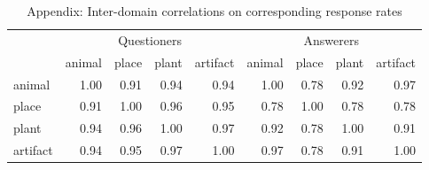 \documentclass[11pt, floatsintext]{apa6}
\begin{document}
\begin{table}[t!]
\centering
\begin{tabular}{ p{1.5cm} | r | r | r | r |||||| r | r | r | r |}
& \multicolumn{4}{c||||||}{Questioners} & \multicolumn{4}{c}{Answerers} \\
&             animal &     place &     plant &  artifact &            animal &     place &     plant &  artifact \\
\hline
animal &   1.00 &  0.91 & 0.94 & 0.94 & 1.00 & 0.78 & 0.92 &  0.97 \\
\hline
place &    0.91 &  1.00 & 0.96 & 0.95 & 0.78 & 1.00 &  0.78 & 0.78 \\
\hline
plant &    0.94 & 0.96 & 1.00 & 0.97 & 0.92  & 0.78 &  1.00 & 0.91\\
\hline
artifact & 0.94 & 0.95 & 0.97 & 1.00 & 0.97 & 0.78 &  0.91 & 1.00\\
\end{tabular}
\\[1.5pt]
\caption{Appendix: Inter-domain correlations on corresponding response rates} 
\label{table:experiment4correlations}
\end{table}
\end{document}
